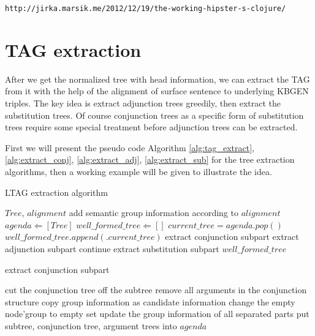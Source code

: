 \documentclass[a4paper]{article}
\begin{document}
\texttt{http://jirka.marsik.me/2012/12/19/the-working-hipster-s-clojure/}


\section{TAG extraction}
\label{sec:tag-ext}
After we get the normalized tree with head information, we can extract the TAG from it with the help of the alignment of surface sentence to underlying KBGEN triples.
The key idea is extract adjunction trees greedily, then extract the substitution trees. Of course conjunction trees as a specific form of substitution trees require
some special treatment before adjunction trees can be extracted.

First we will present the pseudo code Algorithm \ref{alg:tag_extract}, \ref{alg:extract_conj}, \ref{alg:extract_adj}, \ref{alg:extract_sub} for the tree extraction algorithms, then a working example will be given to illustrate the idea.
\begin{algorithm}
    \caption{LTAG extraction algorithm}
    \label{alg:tag_extract}
    \begin{algorithmic}[1]
        \REQUIRE $Tree$, $alignment$ 
        \STATE add semantic group information according to $alignment$
        \ENDFOR
        \STATE $agenda \Leftarrow [Tree]$
        \STATE $well\_formed\_tree \Leftarrow []$
            \STATE $current\_tree = agenda.pop() $
            \STATE $well\_formed\_tree.append(.current\_tree)$
            \ENDIF
            \STATE extract conjunction subpart
            \STATE extract adjunction subpart
                \STATE continue
            \ELSE
                \STATE extract substitution subpart
            \ENDIF
        \ENDWHILE
        \RETURN $well\_formed\_tree$
    \end{algorithmic}
\end{algorithm}

\begin{algorithm}
    \caption{extract conjunction subpart}
    \label{alg:extract_conj}
    \begin{algorithmic}[1]
                \STATE cut the conjunction tree off the subtree
                \STATE remove all arguments in the conjunction structure
                \STATE copy group information as candidate information
                \STATE change the empty node'group to empty set
                \STATE update the group information of all separated parts 
                \STATE put subtree, conjunction tree, argument trees into $agenda$
            \ENDIF
        \ENDFOR
    \end{algorithmic}
\end{algorithm}
\end{document}
